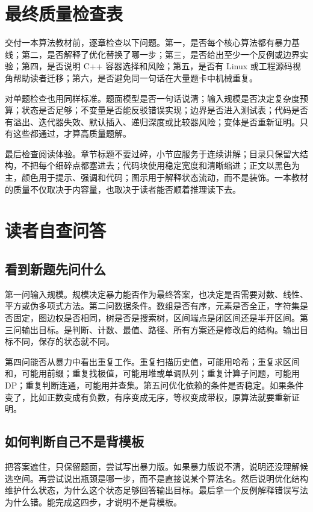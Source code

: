 \section{最终质量检查表}

交付一本算法教材前，逐章检查以下问题。第一，是否每个核心算法都有暴力基线；第二，是否解释了优化替换了哪一步；第三，是否给出至少一个反例或边界实验；第四，是否说明 C++ 容器选择和风险；第五，是否有 Linux 或工程源码视角帮助读者迁移；第六，是否避免同一句话在大量题卡中机械重复。

对单题检查也用同样标准。题面模型是否一句话说清；输入规模是否决定复杂度预算；状态是否足够；不变量是否能反驳错误实现；边界是否进入测试表；代码是否有溢出、迭代器失效、默认插入、递归深度或比较器风险；变体是否重新证明。只有这些都通过，才算高质量题解。

最后检查阅读体验。章节标题不要过碎，小节应服务于连续讲解；目录只保留大结构，不把每个细碎点都塞进去；代码块使用稳定宽度和清晰缩进；正文以黑色为主，颜色用于提示、强调和代码；图示用于解释状态流动，而不是装饰。一本教材的质量不仅取决于内容量，也取决于读者能否顺着推理读下去。

\section{读者自查问答}

\subsection{看到新题先问什么}

第一问输入规模。规模决定暴力能否作为最终答案，也决定是否需要对数、线性、平方或伪多项式方法。第二问数据条件。数组是否有序，元素是否全正，字符集是否固定，图边权是否相同，树是否是搜索树，区间端点是闭区间还是半开区间。第三问输出目标。是判断、计数、最值、路径、所有方案还是修改后的结构。输出目标不同，保存的状态就不同。

第四问能否从暴力中看出重复工作。重复扫描历史值，可能用哈希；重复求区间和，可能用前缀；重复找极值，可能用堆或单调队列；重复计算子问题，可能用 DP；重复判断连通，可能用并查集。第五问优化依赖的条件是否稳定。如果条件变了，比如正数变成有负数，有序变成无序，等权变成带权，原算法就要重新证明。

\subsection{如何判断自己不是背模板}

把答案遮住，只保留题面，尝试写出暴力版。如果暴力版说不清，说明还没理解候选空间。再尝试说出瓶颈是哪一步，而不是直接说某个算法名。然后说明优化结构维护什么状态，为什么这个状态足够回答输出目标。最后拿一个反例解释错误写法为什么错。能完成这四步，才说明不是背模板。

